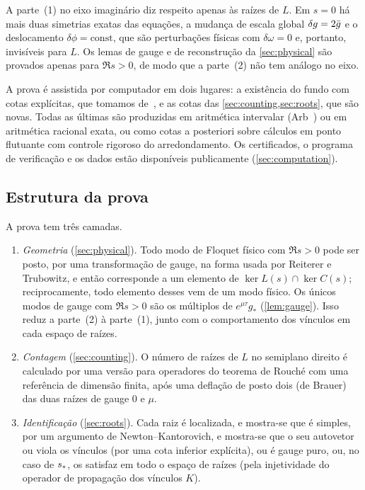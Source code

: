 \begin{remark}\label{rem:neutral}
A parte~(1) no eixo imaginário diz respeito apenas às raízes de $L$. Em $s=0$ há mais duas simetrias exatas
das equações, a mudança de escala global $\delta g=2\bar g$ e o deslocamento $\delta\phi=\mathrm{const}$,
que são perturbações físicas com $\delta\omega=0$ e, portanto, invisíveis para $L$. Os lemas de gauge e de
reconstrução da \cref{sec:physical} são provados apenas para $\Re s>0$, de modo que a parte~(2) não tem análogo no
eixo.
\end{remark}

\begin{remark}\label{rem:computation}
A prova é assistida por computador em dois lugares: a existência do fundo com cotas explícitas, que
tomamos de~\cite{RT2019}, e as cotas das \cref{sec:counting,sec:roots}, que são novas. Todas as
últimas são produzidas em aritmética intervalar (Arb~\cite{Arb}) ou em aritmética racional exata, ou como cotas
a posteriori sobre cálculos em ponto flutuante com controle rigoroso do arredondamento. Os certificados, o programa
de verificação e os dados estão disponíveis publicamente (\cref{sec:computation}).
\end{remark}

\subsection{Estrutura da prova}\label{sec:main-structure}
A prova tem três camadas.
\begin{enumerate}[label=(\roman*),leftmargin=*]
\item \emph{Geometria} (\cref{sec:physical}). Todo modo de Floquet físico com $\Re s>0$ pode ser posto, por uma
  transformação de gauge, na forma usada por Reiterer e Trubowitz, e então corresponde a um elemento de
  $\ker L(s)\cap\ker C(s)$; reciprocamente, todo elemento desses vem de um modo físico. Os únicos modos de gauge
  com $\Re s>0$ são os múltiplos de $e^{\mu\tau}g_*$ (\cref{lem:gauge}). Isso reduz a
  parte~(2) à parte~(1), junto com o comportamento dos vínculos em cada espaço de raízes.
\item \emph{Contagem} (\cref{sec:counting}). O número de raízes de $L$ no semiplano direito é
  calculado por uma versão para operadores do teorema de Rouch\'e com uma referência de dimensão finita, após uma
  deflação de posto dois (de Brauer) das duas raízes de gauge $0$ e $\mu$.
\item \emph{Identificação} (\cref{sec:roots}). Cada raiz é localizada, e mostra-se que é simples, por um
  argumento de Newton--Kantorovich, e mostra-se que o seu autovetor ou viola os vínculos (por uma
  cota inferior explícita), ou é gauge puro, ou, no caso de $s_{\ast}$, os satisfaz em todo o espaço de raízes
  (pela injetividade do operador de propagação dos vínculos $K$).
\end{enumerate}
